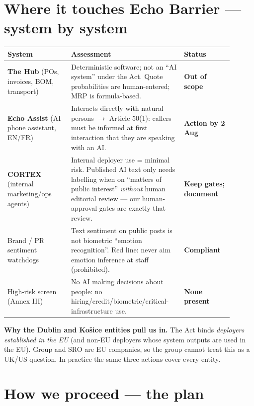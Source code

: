 \documentclass[11pt]{article}
\newcommand{\statusok}[1]{\textcolor{ebgreen}{\textbf{#1}}}
\newcommand{\statusact}[1]{\textcolor{eborange}{\textbf{#1}}}
\newcommand{\whybox}[2]{\par\vspace{4pt}\noindent\colorbox{ebtint}{\parbox{\dimexpr\linewidth-2\fboxsep}%
  {\vspace{3pt}\hspace{2pt}\textbf{\color{ebgreen}#1} #2\hspace{2pt}\vspace{3pt}}}\par\vspace{4pt}}
\begin{document}
\section{Where it touches Echo Barrier --- system by system}

\begin{center}
\begin{tabular}{@{}p{0.26\linewidth}p{0.44\linewidth}p{0.20\linewidth}@{}}
\toprule
\textbf{\color{ebgreen}System} & \textbf{\color{ebgreen}Assessment} & \textbf{\color{ebgreen}Status} \\
\midrule
\textbf{The Hub} (POs, invoices, BOM, transport) & Deterministic software; not an ``AI system'' under the Act. Quote probabilities are human-entered; MRP is formula-based. & \statusok{Out of scope} \\
\addlinespace
\textbf{Echo Assist} (AI phone assistant, EN/FR) & Interacts directly with natural persons $\rightarrow$ Article 50(1): callers must be informed at first interaction that they are speaking with an AI. & \statusact{Action by 2 Aug} \\
\addlinespace
\textbf{CORTEX} (internal marketing/ops agents) & Internal deployer use = minimal risk. Published AI text only needs labelling when on ``matters of public interest'' \emph{without} human editorial review --- our human-approval gates are exactly that review. & \statusok{Keep gates; document} \\
\addlinespace
Brand / PR sentiment watchdogs & Text sentiment on public posts is not biometric ``emotion recognition''. Red line: never aim emotion inference at staff (prohibited). & \statusok{Compliant} \\
\addlinespace
High-risk screen (Annex III) & No AI making decisions about people: no hiring/credit/biometric/critical-infrastructure use. & \statusok{None present} \\
\bottomrule
\end{tabular}
\end{center}

\whybox{Why the Dublin and Ko\v{s}ice entities pull us in.}{The Act binds
\emph{deployers established in the EU} (and non-EU deployers whose system outputs
are used in the EU). Group and SRO are EU companies, so the group cannot treat
this as a UK/US question. In practice the same three actions cover every entity.}

\section{How we proceed --- the plan}
\end{document}
